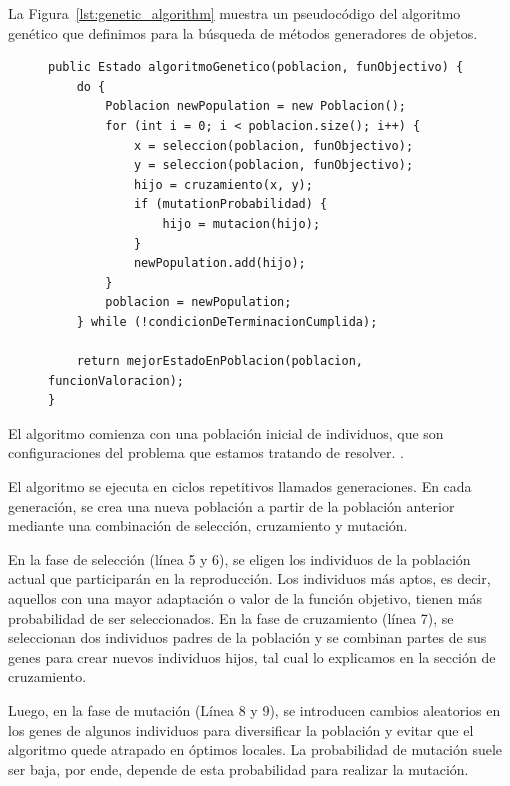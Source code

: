 La Figura~\ref{lst:genetic_algorithm} muestra un pseudocódigo del algoritmo genético que definimos para la búsqueda de métodos generadores de objetos.

\begin{figure}[H]


\begin{lstlisting}[style=javaStyle, caption={Algoritmo genético en Java}, label={lst:genetic_algorithm}]
public Estado algoritmoGenetico(poblacion, funObjectivo) {
    do {
        Poblacion newPopulation = new Poblacion();
        for (int i = 0; i < poblacion.size(); i++) {
            x = seleccion(poblacion, funObjectivo);
            y = seleccion(poblacion, funObjectivo);
            hijo = cruzamiento(x, y);
            if (mutationProbabilidad) {
                hijo = mutacion(hijo);
            }
            newPopulation.add(hijo);
        }
        poblacion = newPopulation;
    } while (!condicionDeTerminacionCumplida);
    
    return mejorEstadoEnPoblacion(poblacion, funcionValoracion);
}
\end{lstlisting}
\end{figure}

El algoritmo comienza con una población inicial de individuos, que son configuraciones del problema que estamos tratando de resolver. .

El algoritmo se ejecuta en ciclos repetitivos llamados generaciones. En cada generación, se crea una nueva población a partir de la población anterior mediante una combinación de selección, cruzamiento y mutación.

En la fase de selección (línea 5 y 6), se eligen los individuos de la población actual que participarán en la reproducción.
Los individuos más aptos, es decir, aquellos con una mayor adaptación o valor de la función objetivo, tienen más probabilidad de ser seleccionados.
En la fase de cruzamiento (línea 7), se seleccionan dos individuos padres de la población y se combinan partes de sus genes para crear nuevos individuos hijos, tal cual lo explicamos en la sección de cruzamiento. 

Luego, en la fase de mutación (Línea 8 y 9), se introducen cambios aleatorios en los genes de algunos individuos para diversificar la población y evitar que el algoritmo quede atrapado en óptimos locales. La probabilidad de mutación suele ser baja, por ende, depende de esta probabilidad para realizar la mutación.

